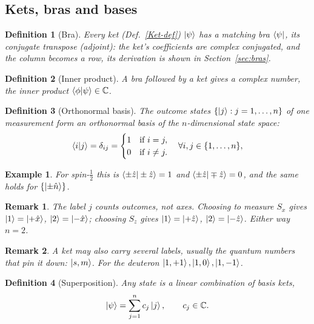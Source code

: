 \documentclass{article}
\newtheorem{definition}{Definition}
\newtheorem*{example}{Example}
\newtheorem{remark}{Remark}
\begin{document}
\subsection{Kets, bras and bases}
\begin{definition}[Bra]
    Every ket (Def.~\ref{Ket-def}) $\ket{\psi}$ has a matching bra $\bra{\psi}$, its conjugate transpose (adjoint): the ket's coefficients are complex conjugated, and the column becomes a row, its derivation is shown in Section~\ref{sec:bras}.
\end{definition}
\begin{definition}[Inner product]
    A bra followed by a ket gives a complex number, the inner product $\braket{\phi|\psi} \in \mathbb{C}$.
\end{definition}
\begin{definition}[Orthonormal basis]
    The outcome states $\{\ket{j} : j = 1,\dots,n\}$ of one measurement form an orthonormal basis of the $n$-dimensional state space:
    \begin{equation}
        \braket{i|j} = \delta_{ij} = \begin{cases}1 & \text{if } i = j, \\ 0 & \text{if } i \neq j.\end{cases} \quad \forall i, j \in \{1,\dots,n\},
    \end{equation}
\end{definition}
\begin{example}
    For spin-$\tfrac12$ this is $\braket{\pm\hat{z}|\pm\hat{z}} = 1$ and $\braket{\pm\hat{z}|\mp\hat{z}} = 0$, and the same holds for $\{\ket{\pm\hat{n}}\}$.
\end{example}
\begin{remark}
    The label $j$ counts \emph{outcomes}, not axes. Choosing to measure $S_x$ gives $\ket{1} = \ket{+\hat{x}}$, $\ket{2} = \ket{-\hat{x}}$; choosing $S_z$ gives $\ket{1} = \ket{+\hat{z}}$, $\ket{2} = \ket{-\hat{z}}$. Either way $n = 2$.
\end{remark}
\begin{remark}
    A ket may also carry several labels, usually the quantum numbers that pin it down: $\ket{s,m}$. For the deuteron $\ket{1,+1}, \ket{1,0}, \ket{1,-1}$.
\end{remark}
\begin{definition}[Superposition]
    Any state is a linear combination of basis kets,
    \begin{equation}
        \ket{\psi} = \sum_{j=1}^{n} c_j\ket{j}, \qquad c_j \in \mathbb{C}.
    \end{equation}
\end{definition}
\end{document}
